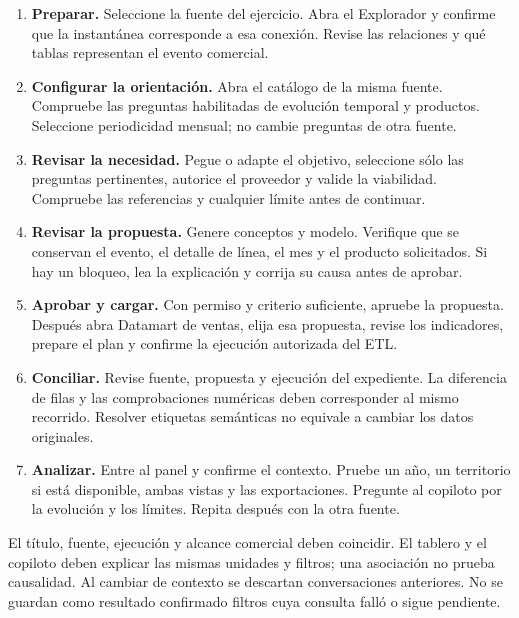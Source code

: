 \documentclass[11pt,a4paper]{article}
\newcommand{\subtitulo}[1]{\par\vspace{2mm}{\large\color{navy}\textbf{#1}}\par}
\begin{document}
\begin{enumerate}
\item \textbf{Preparar.} Seleccione la fuente del ejercicio. Abra el Explorador
y confirme que la instantánea corresponde a esa conexión. Revise las relaciones
y qué tablas representan el evento comercial.
\item \textbf{Configurar la orientación.} Abra el catálogo de la misma fuente.
Compruebe las preguntas habilitadas de evolución temporal y productos.
Seleccione periodicidad mensual; no cambie preguntas de otra fuente.
\item \textbf{Revisar la necesidad.} Pegue o adapte el objetivo, seleccione sólo
las preguntas pertinentes, autorice el proveedor y valide la viabilidad.
Compruebe las referencias y cualquier límite antes de continuar.
\item \textbf{Revisar la propuesta.} Genere conceptos y modelo. Verifique que
se conservan el evento, el detalle de línea, el mes y el producto solicitados.
Si hay un bloqueo, lea la explicación y corrija su causa antes de aprobar.
\item \textbf{Aprobar y cargar.} Con permiso y criterio suficiente, apruebe la
propuesta. Después abra Datamart de ventas, elija esa propuesta, revise los
indicadores, prepare el plan y confirme la ejecución autorizada del ETL.
\item \textbf{Conciliar.} Revise fuente, propuesta y ejecución del expediente.
La diferencia de filas y las comprobaciones numéricas deben corresponder al mismo
recorrido. Resolver etiquetas semánticas no equivale a cambiar los datos originales.
\item \textbf{Analizar.} Entre al panel y confirme el contexto. Pruebe un año,
un territorio si está disponible, ambas vistas y las exportaciones. Pregunte al
copiloto por la evolución y los límites. Repita después con la otra fuente.
\end{enumerate}

\subtitulo{Cómo reconocer un resultado coherente}
El título, fuente, ejecución y alcance comercial deben coincidir. El tablero
y el copiloto deben explicar las mismas unidades y filtros; una asociación no
prueba causalidad. Al cambiar de contexto se descartan conversaciones anteriores.
No se guardan como resultado confirmado filtros cuya consulta falló o sigue pendiente.
\end{document}
